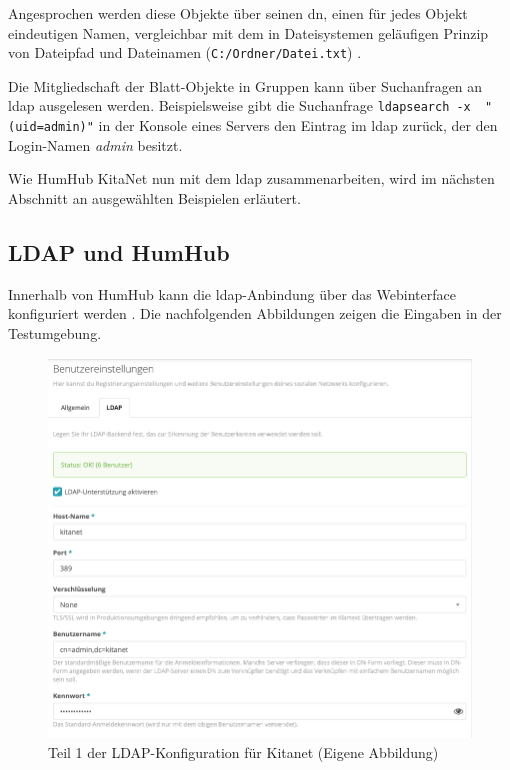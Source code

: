 Angesprochen werden diese Objekte über seinen \ac{dn}, einen für jedes Objekt eindeutigen Namen, vergleichbar mit dem in Dateisystemen geläufigen Prinzip von Dateipfad und Dateinamen (\zb \verb+C:/Ordner/Datei.txt+) \citep[vgl.][613]{Deimeke2019}. 

Die Mitgliedschaft der Blatt-Objekte in Gruppen kann über Suchanfragen an \ac{ldap} ausgelesen werden. Beispielsweise gibt die Suchanfrage \verb+ldapsearch -x  "(uid=admin)"+ in der Konsole eines Servers den Eintrag im \ac{ldap} zurück, der den Login-Namen \textit{admin} besitzt.

Wie HumHub \bzw KitaNet nun mit dem \ac{ldap} zusammenarbeiten, wird im nächsten Abschnitt an ausgewählten Beispielen erläutert.

\subsection{LDAP und HumHub}

Innerhalb von HumHub kann die \ac{ldap}-Anbindung über das Webinterface konfiguriert werden \citep[vgl.][]{humldap}. Die nachfolgenden Abbildungen zeigen die Eingaben in der Testumgebung. 

\begin{figure}[h]
  \centering
  \includegraphics[width=1.0\textwidth]{res/ldapkitanet1.png}
  \caption{Teil 1 der LDAP-Konfiguration für Kitanet (Eigene Abbildung)}
  \label{fig:LDAP Kitanet Teil 1}
\end{figure}


